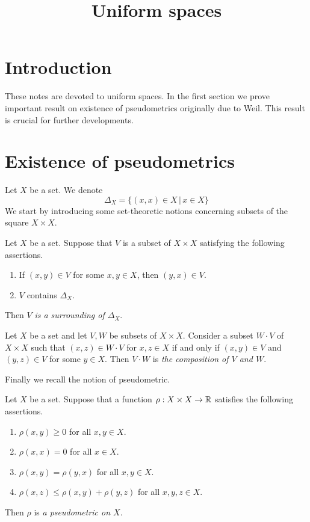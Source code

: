 



\title{Uniform spaces}
\date{}
\maketitle

\section{Introduction}
\noindent
These notes are devoted to uniform spaces. In the first section we prove important result on existence of pseudometrics originally due to Weil. This result is crucial for further developments.

\section{Existence of pseudometrics}
\noindent
Let $X$ be a set. We denote 
$$\Delta_X = \big\{(x,x)\in X\,\big|\,x\in X\big\}$$
We start by introducing some set-theoretic notions concerning subsets of the square $X\times X$.

\begin{definition}
Let $X$ be a set. Suppose that $V$ is a subset of $X\times X$ satisfying the following assertions.
\begin{enumerate}[label=\textbf{(\arabic*)}, leftmargin=*]
\item If $(x,y)\in V$ for some $x,y\in X$, then $(y,x)\in V$.
\item $V$ contains $\Delta_X$.
\end{enumerate}
Then $V$ \textit{is a surrounding of $\Delta_X$}.
\end{definition}

\begin{definition}
Let $X$ be a set and let $V,W$ be subsets of $X\times X$. Consider a subset $W\cdot V$ of $X\times X$ such that $(x,z) \in W\cdot V$ for $x,z\in X$ if and only if $(x,y)\in V$ and $(y,z)\in V$ for some $y\in X$. Then $V\cdot W$ is \textit{the composition of $V$ and $W$}.
\end{definition}
\noindent
Finally we recall the notion of pseudometric.

\begin{definition}
Let $X$ be a set. Suppose that a function $\rho:X\times X\rightarrow {\mathbb R}$ satisfies the following assertions.
\begin{enumerate}[label=\textbf{(\arabic*)}, leftmargin=*]
\item $\rho(x,y) \geq 0$ for all $x,y\in X$.
\item $\rho(x,x) = 0$ for all $x\in X$.
\item $\rho(x,y) = \rho(y,x)$ for all $x,y\in X$.
\item $\rho(x,z)\leq \rho(x,y) + \rho(y,z)$ for all $x,y,z\in X$.
\end{enumerate}
Then $\rho$ is \textit{a pseudometric on $X$}.
\end{definition}

